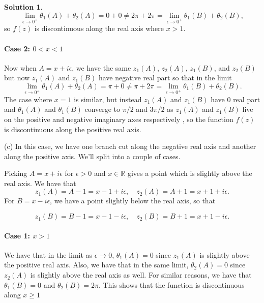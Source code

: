 \documentclass[12pt]{article}
\newcommand{\bbR}{\mathbb{R}}
\theoremstyle{definition}
\newtheorem{sol}{Solution}
\theoremstyle{remark}
\begin{document}
\begin{sol}
    \begin{equation*}
        \lim_{\epsilon\to 0^+} \theta_{1}(A) + \theta_{2}(A) = 0 + 0 \neq 2\pi + 2\pi = \lim_{\epsilon\to 0^+} \theta_{1}(B) + \theta_{2}(B),
    \end{equation*}
    so $f(z)$ is discontinuous along the real axis where $x > 1$.

    \paragraph{Case 2: $0<x<1$}%

    Now when $A = x + i \epsilon$, we have the same $z_1(A)$, $z_2(A)$, $z_1(B)$, and $z_2(B)$ but now $z_1(A)$ and $z_1(B)$ have negative real part so that in the limit
    \begin{equation*}
        \lim_{\epsilon\to 0^+} \theta_{1}(A) + \theta_{2}(A) = \pi + 0 \neq \pi + 2\pi = \lim_{\epsilon\to 0^+} \theta_{1}(B) + \theta_{2}(B).
    \end{equation*}
    The case where $x=1$ is similar, but instead $z_1(A)$ and $z_1(B)$ have 0 real part and $\theta_1(A)$ and $\theta_1(B)$ converge to $\pi / 2$ and $3\pi / 2 $ as $z_1(A)$ and $z_1(B)$ live on the positive and negative imaginary axes respectively , so the function $f(z)$ is discontinuous along the positive real axis.

    \newpage

    (c) In this case, we have one branch cut along the negative real axis and another along the positive axis. We'll split into a couple of cases.

    Picking $A = x + i\epsilon$ for $\epsilon > 0$ and $x\in\bbR$ gives a point which is slightly above the real axis. We have that 
    \begin{equation}
        z_1(A) = A - 1 = x - 1 + i\epsilon, \quad z_2(A) = A + 1 = x + 1 + i \epsilon.
    \end{equation}
    For $B = x - i\epsilon$, we have a point slightly below the real axis, so that 

    \begin{equation*}
            z_1(B) = B - 1 = x - 1 - i\epsilon, \quad z_2(B) = B + 1 = x + 1 - i \epsilon.
    \end{equation*}

    \paragraph{Case 1: $x>1$}%

    We have that in the limit as $\epsilon\to 0$, $\theta_1(A) = 0$ since $z_1(A)$ is slightly above the positive real axis. Also, we have that in the same limit, $\theta_{2}(A) = 0$ since $z_2(A)$ is slightly above the real axis as well. For similar reasons, we have that $\theta_{1}(B) = 0 $ and $\theta_{2}(B)= 2\pi$. This shows that the function is discontinuous along $x\geq 1$


\end{sol}
\end{document}
